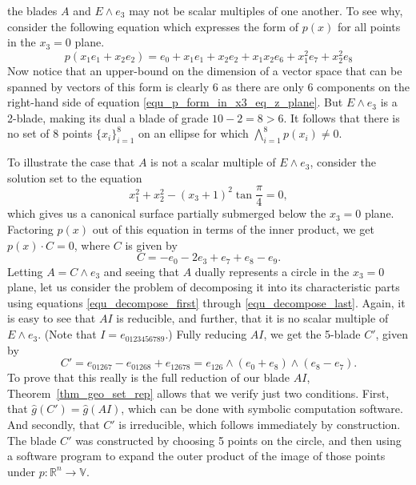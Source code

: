 \documentclass{birkjour}
\theoremstyle{definition}
\theoremstyle{remark}
\numberwithin{equation}{section}
\newcommand{\R}{\mathbb{R}}
\newcommand{\V}{\mathbb{V}}
\newcommand{\gh}{\hat{g}}
\begin{document}
the blades $A$ and $E\wedge e_3$ may not be scalar multiples of one another.
To see why, consider the following equation which expresses the form of $p(x)$ for all points in the $x_3=0$ plane.
\begin{equation}\label{equ_p_form_in_x3_eq_z_plane}
p(x_1e_1+x_2e_2)=e_0 + x_1e_1 + x_2e_2 + x_1x_2e_6 + x_1^2e_7 + x_2^2e_8
\end{equation}
Now notice that an upper-bound on the dimension of a vector space that can be spanned by vectors
of this form is clearly 6 as there are only 6 components on the right-hand side of equation \eqref{equ_p_form_in_x3_eq_z_plane}.
But $E\wedge e_3$ is a 2-blade, making its dual a blade of grade $10-2=8>6$.  It follows that there is no set of
8 points $\{x_i\}_{i=1}^8$ on an ellipse for which $\bigwedge_{i=1}^8 p(x_i)\neq 0$.

To illustrate the case that $A$ is not a scalar multiple of $E\wedge e_3$, consider the solution set
to the equation
\begin{equation}
x_1^2 + x_2^2 - (x_3+1)^2\tan\frac{\pi}{4}=0,
\end{equation}
which gives us a canonical surface partially submerged below the $x_3=0$ plane.
Factoring $p(x)$ out of this equation in terms of the inner product, we get $p(x)\cdot C=0$,
where $C$ is given by
\begin{equation}
C = -e_0 - 2e_3 + e_7 + e_8 - e_9.
\end{equation}
Letting $A=C\wedge e_3$ and seeing that $A$ dually represents a circle in the $x_3=0$ plane, let us consider
the problem of decomposing it into its characteristic parts using equations
\eqref{equ_decompose_first} through \eqref{equ_decompose_last}.
Again, it is easy to see that $AI$ is reducible, and further, that it is no scalar multiple of $E\wedge e_3$.
(Note that $I=e_{0123456789}$.)
Fully reducing $AI$, we get the 5-blade $C'$, given by
\begin{equation}
C' = e_{01267} - e_{01268} + e_{12678} = e_{126}\wedge(e_0+e_8)\wedge(e_8-e_7).
\end{equation}
To prove that this really is the full reduction of our blade $AI$, Theorem~\ref{thm_geo_set_rep}
allows that we verify just two conditions.
First, that $\gh(C')=\gh(AI)$, which can be done with symbolic computation software.
And secondly, that $C'$ is irreducible, which follows immediately by construction.
The blade $C'$ was constructed by choosing 5 points on the circle, and then using a software
program to expand the outer product of the image of those points under $p:\R^n\to\V$.
\end{document}
